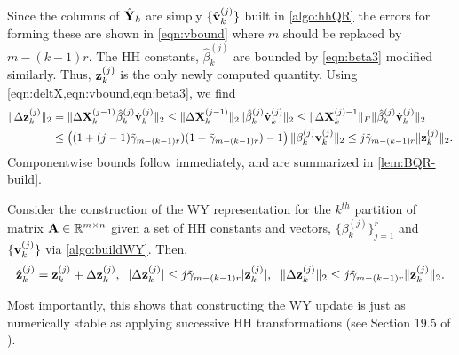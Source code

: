 Since the columns of $\hat{\mathbf{Y}}_k$ are simply $\{\hat{\mathbf{v}}_k^{(j)}\}$ built in \cref{algo:hhQR} the errors for forming these are shown in \cref{eqn:vbound} where $m$ should be replaced by $m-(k-1)r$.
The HH constants, $\hat{\beta}_k^{(j)}$ are bounded by \cref{eqn:beta3} modified similarly. 
Thus, $\mathbf{z}_k^{(j)}$ is the only newly computed quantity. 
Using \cref{eqn:deltX,eqn:vbound,eqn:beta3}, we find
\begin{align*}
\|\Delta \mathbf{z}_k^{(j)}\|_2 &= \|\Delta\mathbf{X}_k^{(j-1)}\hat{\beta}_k^{(j)}\hat{\mathbf{v}}_k^{(j)} \|_2 \leq \|\Delta\mathbf{X}_k^{(j-1)}\|_2 \|\hat{\beta}_k^{(j)}\hat{\mathbf{v}}_k^{(j)}\|_2  \leq \|\Delta\mathbf{X}_k^{(j)-1}\|_F\|\hat{\beta}_k^{(j)}\hat{\mathbf{v}}_k^{(j)}\|_2 \\
& \leq \left((1+(j-1)\tilde{\gamma}_{m-(k-1)r})(1 + \tilde{\gamma}_{m-(k-1)r})-1\right) \| \beta_k^{(j)}\mathbf{v}_k^{(j)}\|_2 \leq j\tilde{\gamma}_{m-(k-1)r}\|\mathbf{z}_k^{(j)}\|_2.
\end{align*}
Componentwise bounds follow immediately, and are summarized in \cref{lem:BQR-build}.
\begin{lemma}\label{lem:BQR-build}
	Consider the construction of the WY representation for the $k^{th}$ partition of matrix $\mathbf{A}\in\mathbb{R}^{m\times n}$ given a set of HH constants and vectors, $\{\beta_k^{(j)}\}_{j=1}^r$ and $\{\mathbf{v}_{k}^{(j)}\}$ via \cref{algo:buildWY}.
	Then, 
	\begin{equation}
		\hat{\bb{z}}_{k}^{(j)} = \bb{z}_{k}^{(j)} + \Delta \bb{z}_{k}^{(j)},\;\; |\Delta \bb{z}_{k}^{(j)}| \leq j\tilde{\gamma}_{m-(k-1)r} |\bb{z}_{k}^{(j)}|,\;\; \|\Delta \bb{z}_k^{(j)}\|_2 \leq j\tilde{\gamma}_{m-(k-1)r}\|\bb{z}_k^{(j)}\|_2.\label{eqn:BQR-z}
	\end{equation}
\end{lemma}
Most importantly, this shows that constructing the WY update is just as numerically stable as applying successive HH transformations (see Section 19.5 of \cite{Higham2002}).

